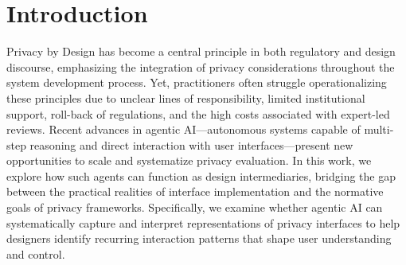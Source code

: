 \documentclass[12pt,letterpaper]{article}
\begin{document}
\section{Introduction }
    Privacy by Design has become a central principle in both regulatory and design discourse, emphasizing the integration of privacy considerations throughout the system development process. Yet, practitioners often struggle operationalizing these principles due to unclear lines of responsibility, limited institutional support, roll-back of regulations, and the high costs associated with expert-led reviews. Recent advances in agentic AI—autonomous systems capable of multi-step reasoning and direct interaction with user interfaces—present new opportunities to scale and systematize privacy evaluation. In this work, we explore how such agents can function as design intermediaries, bridging the gap between the practical realities of interface implementation and the normative goals of privacy frameworks. Specifically, we examine whether agentic AI can systematically capture and interpret representations of privacy interfaces to help designers identify recurring interaction patterns that shape user understanding and control.
    
\end{document}

